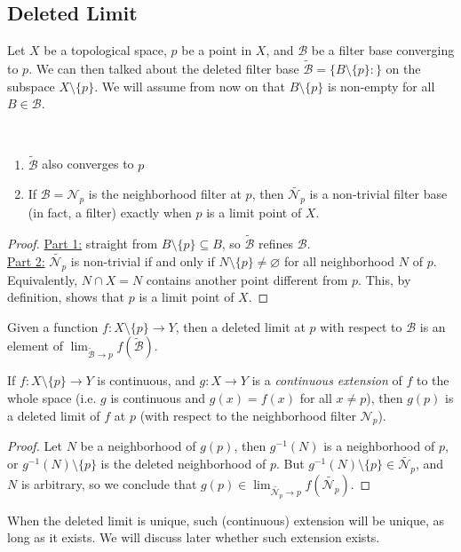 \documentclass{treatise}
\begin{document}
\subsection{Deleted Limit}
Let $X$ be a topological space, $p$ be a point in $X$, and $\mathcal{B}$ be a filter base converging to $p$. We can then talked about the deleted filter base $\tilde{\mathcal{B}} = \{ B \setminus \{ p \} : \}$ on the subspace $X \setminus \{ p \}$. We will assume from now on that $B \setminus \{ p \}$ is non-empty for all $B \in \mathcal{B}$.
\begin{remark} \ 
\begin{enumerate}
    \item $\tilde{\mathcal{B}}$ also converges to $p$
    \item If $\mathcal{B} = \mathcal{N}_p$ is the neighborhood filter at $p$, then $\tilde{\mathcal{N}_p}$ is a non-trivial filter base (in fact, a filter) exactly when $p$ is a limit point of $X$.
\end{enumerate}
\end{remark}
\begin{proof}
\underline{Part 1:} straight from $B \setminus \{ p \} \subseteq B$, so $\tilde{\mathcal{B}}$ refines $\mathcal{B}$.
\\
\underline{Part 2:} $\tilde{\mathcal{N}_p}$ is non-trivial if and only if $N \setminus \{ p \} \neq \varnothing$ for all neighborhood $N$ of $p$. Equivalently, $N \cap X = N$ contains another point different from $p$. This, by definition, shows that $p$ is a limit point of $X$.
\end{proof}
Given a function $f: X \setminus \{ p \} \to Y$, then a deleted limit at $p$ with respect to $\mathcal{B}$ is an element of $\lim_{\tilde{\mathcal{B}} \to p} f(\tilde{\mathcal{B}})$.
\begin{proposition}
If $f: X \setminus \{ p \} \to Y$ is continuous, and $g: X \to Y$ is a \emph{continuous extension} of $f$ to the whole space (i.e. $g$ is continuous and $g(x) = f(x)$ for all $x \neq p$), then $g(p)$ is a deleted limit of $f$ at $p$ (with respect to the neighborhood filter $\mathcal{N}_p$).
\end{proposition}
\begin{proof}
Let $N$ be a neighborhood of $g(p)$, then $g^{-1}(N)$ is a neighborhood of $p$, or $g^{-1}(N) \setminus \{ p \}$ is the deleted neighborhood of $p$. But $g^{-1}(N) \setminus \{ p \} \in \tilde{\mathcal{N}_p}$, and $N$ is arbitrary, so we conclude that $g(p) \in \lim_{\tilde{\mathcal{N}_p} \to p} f(\tilde{\mathcal{N}_p})$.
\end{proof}
\begin{remark}
When the deleted limit is unique, such (continuous) extension will be unique, as long as it exists. We will discuss later whether such extension exists.
\end{remark}
\end{document}
